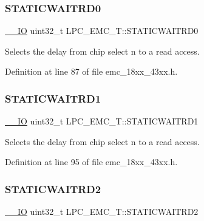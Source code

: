 \subsubsection{\texorpdfstring{S\+T\+A\+T\+I\+C\+W\+A\+I\+T\+R\+D0}{STATICWAITRD0}}
{\footnotesize\ttfamily \hyperlink{core__sc300_8h_aec43007d9998a0a0e01faede4133d6be}{\+\_\+\+\_\+\+IO} uint32\+\_\+t L\+P\+C\+\_\+\+E\+M\+C\+\_\+\+T\+::\+S\+T\+A\+T\+I\+C\+W\+A\+I\+T\+R\+D0}

Selects the delay from chip select n to a read access. 

Definition at line 87 of file emc\+\_\+18xx\+\_\+43xx.\+h.

\mbox{\label{struct_l_p_c___e_m_c___t_a0794304d3d43a5193cc70d65f32e1910}} 
\subsubsection{\texorpdfstring{S\+T\+A\+T\+I\+C\+W\+A\+I\+T\+R\+D1}{STATICWAITRD1}}
{\footnotesize\ttfamily \hyperlink{core__sc300_8h_aec43007d9998a0a0e01faede4133d6be}{\+\_\+\+\_\+\+IO} uint32\+\_\+t L\+P\+C\+\_\+\+E\+M\+C\+\_\+\+T\+::\+S\+T\+A\+T\+I\+C\+W\+A\+I\+T\+R\+D1}

Selects the delay from chip select n to a read access. 

Definition at line 95 of file emc\+\_\+18xx\+\_\+43xx.\+h.

\mbox{\label{struct_l_p_c___e_m_c___t_a590aff83c56953612ba3bcab2ca2d3a2}} 
\subsubsection{\texorpdfstring{S\+T\+A\+T\+I\+C\+W\+A\+I\+T\+R\+D2}{STATICWAITRD2}}
{\footnotesize\ttfamily \hyperlink{core__sc300_8h_aec43007d9998a0a0e01faede4133d6be}{\+\_\+\+\_\+\+IO} uint32\+\_\+t L\+P\+C\+\_\+\+E\+M\+C\+\_\+\+T\+::\+S\+T\+A\+T\+I\+C\+W\+A\+I\+T\+R\+D2}

